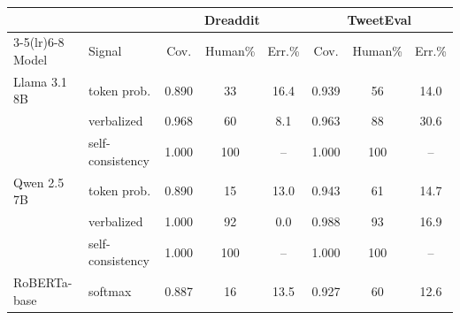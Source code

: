 \begin{tabular}{llcccccc}
\toprule
 & & \multicolumn{3}{c}{Dreaddit} & \multicolumn{3}{c}{TweetEval} \\
\cmidrule(lr){3-5}\cmidrule(lr){6-8}
Model & Signal & Cov. & Human\% & Err.\% & Cov. & Human\% & Err.\% \\
\midrule
Llama 3.1 8B & token prob. & 0.890 & 33 & 16.4 & 0.939 & 56 & 14.0 \\
 & verbalized & 0.968 & 60 & 8.1 & 0.963 & 88 & 30.6 \\
 & self-consistency & 1.000 & 100 & -- & 1.000 & 100 & -- \\
Qwen 2.5 7B & token prob. & 0.890 & 15 & 13.0 & 0.943 & 61 & 14.7 \\
 & verbalized & 1.000 & 92 & 0.0 & 0.988 & 93 & 16.9 \\
 & self-consistency & 1.000 & 100 & -- & 1.000 & 100 & -- \\
RoBERTa-base & softmax & 0.887 & 16 & 13.5 & 0.927 & 60 & 12.6 \\
\bottomrule
\end{tabular}

